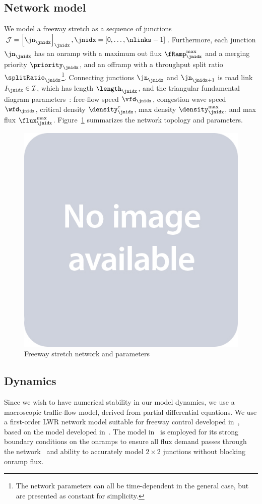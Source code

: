 \subsection{Network model} %
\label{sub:network_model}



We model a freeway stretch as a sequence of junctions $\junctions=\seq{\jn}{\jnidx},\jnidx=\left[0,\ldots,\nlinks -1\right]$.
Furthermore, each junction $\jn_{\jnidx}$ has an onramp with 
a maximum out flux $\rampMax_{\jnidx}$
and a merging priority $\priority_{\jnidx}$, and an offramp with
a throughput split ratio $\splitRatio_{\jnidx}$\footnote{The network parameters can all be time-dependent in the general case, but are presented as constant for simplicity.}. Connecting junctions $\jn_{\jnidx}$ and $\jn_{\jnidx+1}$ is road link $\link_{\jnidx}\in\links$, which has length $\length_\jnidx$, and the triangular fundamental diagram parameters~\cite{daganzo1994cell}: 
free-flow speed $\vfd_{\jnidx}$, 
congestion wave speed $\wfd_{\jnidx}$, 
critical density $\pcfd_{\jnidx}$, 
max density $\pmfd_{\jnidx}$, and
max flux $\fmfd_{\jnidx}$. Figure~\ref{fig:freeway-network} summarizes the network topology and parameters.

\begin{figure}
\centering
\includegraphics[width=.25\columnwidth]{figures/placeholder}
\caption{Freeway stretch network and parameters}
\label{fig:freeway-network}
\end{figure}

\subsection{Dynamics} %
\label{sub:dynamics}

Since we wish to have numerical stability in our model dynamics, we use a macroscopic traffic-flow model, derived from partial differential equations.
We use a first-order LWR \cite{lighthill1955kinematic,richards1956shock} network model suitable for freeway control developed in~\cite{Monache2013}, based on the model developed in~\cite{garavello2006traffic}. The model in~\cite{Monache2013} is employed for its strong boundary conditions on the onramps to ensure all flux demand passes through the network~\cite{strub2006weak} and ability to accurately model $2\times2$ junctions without blocking onramp flux.

